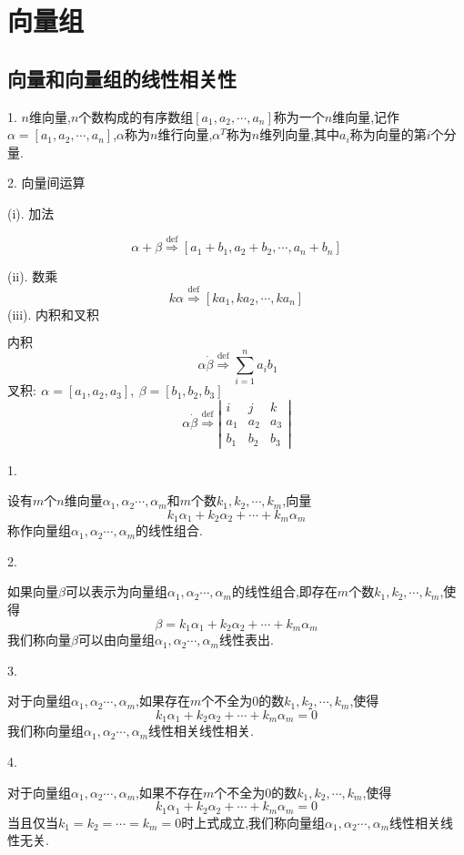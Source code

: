 \chapter{向量组}
\section{向量和向量组的线性相关性}
\begin{definition}[向量的定义和运算]
	1. $n$维向量,$n$个数构成的有序数组$[a_{1},a_{2},\cdots,a_{n}]$称为一个$n$维向量,记作$\alpha=[a_{1},a_{2},\cdots,a_{n}]$,$\alpha$称为$n$维行向量,$\alpha^{T}$称为$n$维列向量,其中$a_{i}$称为向量的第$i$个分量.
	
	2. 向量间运算
	
	(i). 加法
	
	$$\alpha+\beta\overset{\text{def}}{\Longrightarrow}[a_{1}+b_{1},a_{2}+b_{2},\cdots,a_{n}+b_{n}]$$
	
	(ii). 数乘
	$$k\alpha\overset{\text{def}}{\Longrightarrow}[ka_{1},ka_{2},\cdots,ka_{n}]$$
	(iii). 内积和叉积
	
	$\text{内积}$
	$$\ \alpha \dot\beta\overset{\text{def}}{\Longrightarrow}\sum\limits_{i=1}^{n}a_{i}b_{1}$$
	$\text{叉积}:\ \alpha=[a_{1},a_{2},a_{3}],\ \beta=[b_{1},b_{2},b_{3}]$
	$$\alpha \dot\beta\overset{\text{def}}{\Longrightarrow}\left|
	\begin{array}{lll}
		 i&j&k\\
		 a_{1}&a_{2}&a_{3}\\
		 b_{1}&b_{2}&b_{3}
	\end{array}
	\right|  $$
\end{definition}
\begin{definition}[线性相关和线性表出]
	1. 
	
	设有$m$个$n$维向量$\alpha_{1},\alpha_{2}\cdots,\alpha_{m}$和$m$个数$k_{1},k_{2},\cdots,k_{m}$,向量
	$$k_{1}\alpha_{1}+k_{2}\alpha_{2}+\cdots+k_{m}\alpha_{m}$$
	称作向量组$\alpha_{1},\alpha_{2}\cdots,\alpha_{m}$的线性组合.
	
	2. 
	
	如果向量$\beta$可以表示为向量组$\alpha_{1},\alpha_{2}\cdots,\alpha_{m}$的线性组合,即存在$m$个数$k_{1},k_{2},\cdots,k_{m}$,使得
	$$\beta=k_{1}\alpha_{1}+k_{2}\alpha_{2}+\cdots+k_{m}\alpha_{m}$$
	我们称向量$\beta$可以由向量组$\alpha_{1},\alpha_{2}\cdots,\alpha_{m}$线性表出.
	
	3. 
	
	对于向量组$\alpha_{1},\alpha_{2}\cdots,\alpha_{m}$,如果存在$m$个不全为0的数$k_{1},k_{2},\cdots,k_{m}$,使得
	$$k_{1}\alpha_{1}+k_{2}\alpha_{2}+\cdots+k_{m}\alpha_{m}=0$$
	我们称向量组$\alpha_{1},\alpha_{2}\cdots,\alpha_{m}$线性相关线性相关.
	
	4. 
	
	对于向量组$\alpha_{1},\alpha_{2}\cdots,\alpha_{m}$,如果不存在$m$个不全为0的数$k_{1},k_{2},\cdots,k_{m}$,使得
	$$k_{1}\alpha_{1}+k_{2}\alpha_{2}+\cdots+k_{m}\alpha_{m}=0$$
	当且仅当$k_{1}=k_{2}=\cdots=k_{m}=0$时上式成立,我们称向量组$\alpha_{1},\alpha_{2}\cdots,\alpha_{m}$线性相关线性无关.
\end{definition}
